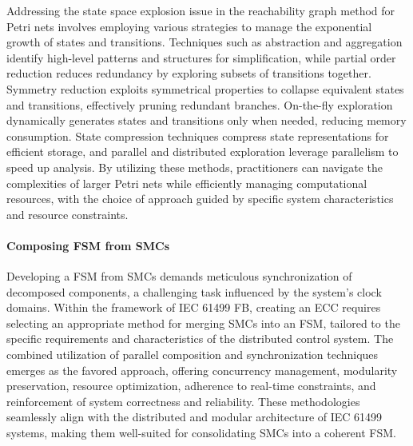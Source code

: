 \begin{bibunit}
Addressing the state space explosion issue in the reachability graph method for Petri nets involves employing various strategies to manage the exponential growth of states and transitions. Techniques such as abstraction and aggregation identify high-level patterns and structures for simplification, while partial order reduction reduces redundancy by exploring subsets of transitions together. Symmetry reduction exploits symmetrical properties to collapse equivalent states and transitions, effectively pruning redundant branches. On-the-fly exploration dynamically generates states and transitions only when needed, reducing memory consumption. State compression techniques compress state representations for efficient storage, and parallel and distributed exploration leverage parallelism to speed up analysis. By utilizing these methods, practitioners can navigate the complexities of larger Petri nets while efficiently managing computational resources, with the choice of approach guided by specific system characteristics and resource constraints.

\paragraph{Composing FSM from SMCs}
Developing a FSM from SMCs demands meticulous synchronization of decomposed components, a challenging task influenced by the system's clock domains. Within the framework of IEC 61499 FB, creating an ECC requires selecting an appropriate method for merging SMCs into an FSM, tailored to the specific requirements and characteristics of the distributed control system. The combined utilization of parallel composition and synchronization techniques emerges as the favored approach, offering concurrency management, modularity preservation, resource optimization, adherence to real-time constraints, and reinforcement of system correctness and reliability. These methodologies seamlessly align with the distributed and modular architecture of IEC 61499 systems, making them well-suited for consolidating SMCs into a coherent FSM.


\end{bibunit}
